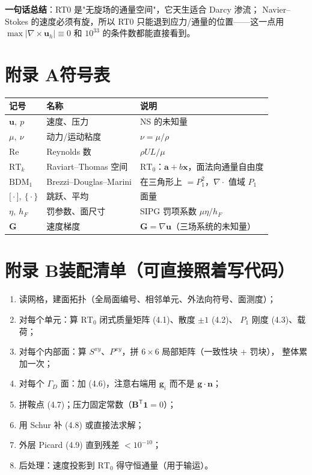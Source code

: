 \documentclass[UTF8,11pt,a4paper]{ctexart}
\theoremstyle{wjplain}
\theoremstyle{wjdef}
\newcommand{\bn}{\boldsymbol n}
\newcommand{\bu}{\boldsymbol u}
\newcommand{\bx}{\boldsymbol x}
\newcommand{\bg}{\boldsymbol g}
\newcommand{\bG}{\boldsymbol G}
\newcommand{\ba}{\boldsymbol a}
\newcommand{\bB}{\boldsymbol B}
\newcommand{\grad}{\nabla}
\newcommand{\dive}{\nabla\cdot}
\newcommand{\curl}{\nabla\times}
\newcommand{\avg}[1]{\bigl\{#1\bigr\}}
\newcommand{\jump}[1]{\bigl[#1\bigr]}
\newcommand{\RT}{\mathrm{RT}}
\begin{document}
\vspace{0.6em}
\noindent\textbf{一句话总结}：RT0 是"无旋场的通量空间"，它天生适合 Darcy 渗流；
Navier--Stokes 的速度必须有旋，所以 RT0 只能退到应力/通量的位置——这一点用
$\max\lvert\curl\bu_h\rvert\equiv0$ 和 $10^{33}$ 的条件数都能直接看到。

\appendix
\section{\texorpdfstring{附录 A\quad 符号表}{附录 A 符号表}}
\begin{table}[H]
\centering\small
\begin{tabularx}{\textwidth}{@{}l l X@{}}
\toprule
记号 & 名称 & 说明 \\
\midrule
$\bu,\ p$ & 速度、压力 & NS 的未知量 \\
$\mu,\ \nu$ & 动力/运动粘度 & $\nu=\mu/\rho$ \\
$\mathrm{Re}$ & Reynolds 数 & $\rho UL/\mu$ \\
$\RT_k$ & Raviart--Thomas 空间 & $\RT_0$：$\ba+b\bx$，面法向通量自由度 \\
$\mathrm{BDM}_1$ & Brezzi--Douglas--Marini & 在三角形上 $=P_1^2$，$\dive$ 值域 $P_1$ \\
$\jump{\cdot},\ \avg{\cdot}$ & 跳跃、平均 & 面量 \\
$\eta,\ h_F$ & 罚参数、面尺寸 & SIPG 罚项系数 $\mu\eta/h_F$ \\
$\bG$ & 速度梯度 & $\bG=\grad\bu$（三场系统的未知量） \\
\bottomrule
\end{tabularx}
\end{table}

\section{\texorpdfstring{附录 B\quad 装配清单（可直接照着写代码）}{附录 B 装配清单}}
\begin{enumerate}
  \item 读网格，建面拓扑（全局面编号、相邻单元、外法向符号、面测度）；
  \item 对每个单元：算 $\RT_0$ 闭式质量矩阵 (4.1)、散度 $\pm1$ (4.2)、
        $P_1$ 刚度 (4.3)、载荷；
  \item 对每个内部面：算 $S^{xy}$、$P^{xy}$，拼 $6\times6$ 局部矩阵（一致性块 + 罚块），
        整体累加一次；
  \item 对每个 $\Gamma_D$ 面：加 (4.6)，注意右端用 $\bg_i$ 而不是 $\bg\cdot\bn$；
  \item 拼鞍点 (4.7)；压力固定常数（$\bB^{\mathsf T}\boldsymbol1=0$）；
  \item 用 Schur 补 (4.8) 或直接法求解；
  \item 外层 Picard (4.9) 直到残差 $<10^{-10}$；
  \item 后处理：速度投影到 $\RT_0$ 得守恒通量（用于输运）。
\end{enumerate}
\end{document}

